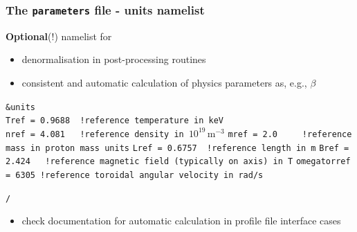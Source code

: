 \documentclass[9pt]{beamer}
\begin{document}

\begin{frame}[fragile]
  \frametitle{The {\tt parameters} file - units namelist}

\begin{block}

{\bf Optional}(!) namelist for
\begin{itemize}
 \item denormalisation in post-processing routines
 \item consistent and automatic calculation of physics parameters as, e.g., $\beta$
\end{itemize}

\begin{block}

\verb|&units|\\
\verb|Tref = 0.9688  !reference temperature in keV|\\
\verb|nref = 4.081   !reference density in |$10^{19}\,\textrm{m}^{-3}$
\verb|mref = 2.0     !reference mass in proton mass units|
\verb|Lref = 0.6757  !reference length in m|
\verb|Bref = 2.424   !reference magnetic field (typically on axis) in T|
\verb|omegatorref = 6305 !reference toroidal angular velocity in rad/s|

\verb|/|
\end{block}
\begin{itemize}
 \item check documentation for automatic calculation in profile file interface cases
\end{itemize}

\end{block}

\end{frame}

\end{document}

